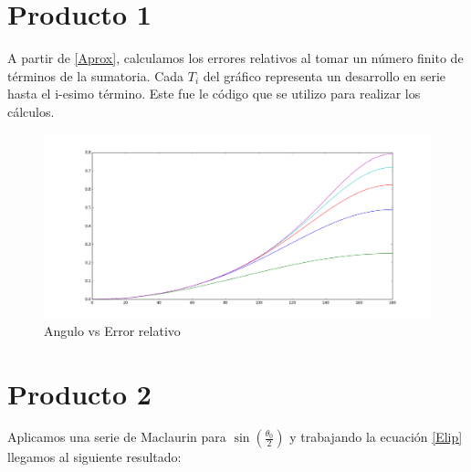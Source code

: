\documentclass[12pt]{article}
\begin{document}
\section{Producto 1}
A partir de \eqref{Aprox}, calculamos los errores relativos al tomar un número finito de términos de la sumatoria. Cada $T_i$ del gráfico representa un desarrollo en serie hasta el i-esimo término. 
Este fue le código que se utilizo para realizar los cálculos.

\begin{figure}[H]
\centering
\includegraphics[width=15cm]{Error.png}
\caption{Angulo vs Error relativo}
\end{figure}


\section{Producto 2}
Aplicamos una serie de Maclaurin para $ \sin\left(\frac{\theta_0}{2}\right)$ y trabajando la ecuación \eqref{Elip} llegamos al siguiente resultado:
\end{document}
